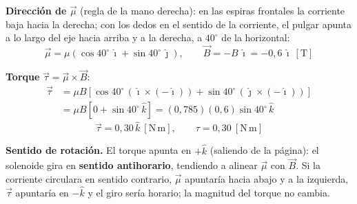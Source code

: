 \documentclass[12pt,letterpaper]{article}
\begin{document}
\noindent\textbf{Direcci\'on de $\vec{\mu}$} (regla de la mano derecha): en las espiras frontales la
corriente baja hacia la derecha; con los dedos en el sentido de la corriente, el pulgar apunta a lo
largo del eje hacia arriba y a la derecha, a $40^\circ$ de la horizontal:
\[
    \vec{\mu} = \mu\left(\cos40^\circ\,\hat{\imath} + \sin40^\circ\,\hat{\jmath}\right),
    \qquad
    \vec{B} = -B\,\hat{\imath} = -0{,}6\,\hat{\imath}\ [\text{T}]
\]

\noindent\textbf{Torque} $\vec{\tau} = \vec{\mu}\times\vec{B}$:
\begin{align*}
    \vec{\tau} &= \mu B\left[\cos40^\circ\,(\hat{\imath}\times(-\hat{\imath}))
                  + \sin40^\circ\,(\hat{\jmath}\times(-\hat{\imath}))\right]\\[2pt]
               &= \mu B\left[0 + \sin40^\circ\,\hat{k}\right]
                = (0{,}785)(0{,}6)\sin40^\circ\,\hat{k}
\end{align*}
\[
    \boxed{\vec{\tau} = 0{,}30\,\hat{k}\ [\text{N}\,\text{m}],\qquad \tau = 0{,}30\ [\text{N}\,\text{m}]}
\]

\noindent\textbf{Sentido de rotaci\'on.} El torque apunta en $+\hat{k}$ (saliendo de la p\'agina):
el solenoide gira en \textbf{sentido antihorario}, tendiendo a alinear $\vec{\mu}$ con $\vec{B}$.
Si la corriente circulara en sentido contrario, $\vec{\mu}$ apuntar\'ia hacia abajo y a la izquierda,
$\vec{\tau}$ apuntar\'ia en $-\hat{k}$ y el giro ser\'ia horario; la magnitud del torque no cambia.
\end{document}
